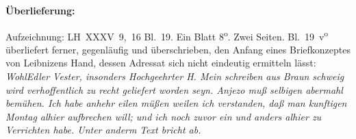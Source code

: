 %
%
%
%
\frenchspacing%
%
\begin{ledgroupsized}[r]{120mm}
\footnotesize
\pstart
\noindent\textbf{Überlieferung:}
\pend
\end{ledgroupsized}
\begin{ledgroupsized}[r]{114mm}
\footnotesize
\pstart \parindent -6mm
%
Aufzeichnung:
LH~XXXV~9,~16 Bl.~19.
Ein Blatt 8\textsuperscript{o}.
Zwei Seiten.
Bl.~19~v\textsuperscript{o} überliefert ferner, gegenläufig und überschrieben, den Anfang eines Briefkonzeptes von Leibnizens Hand,
dessen Adressat sich nicht eindeutig ermitteln lässt: %
\textit{WohlEdler Vester,\protect{} %
insonders Hochgeehrter H. %
Mein schreiben aus Braun%
schweig\protect{} wird verhoffentlich %
zu recht geliefert worden %
seyn. Anjezo muß %
selbigen abermahl bemühen. %
Ich habe anhehr eilen müßen %
weilen ich verstanden, daß %
man kunftigen Montag %
alhier aufbrechen will; und %
ich noch zuvor ein und anders %
alhier zu Verrichten habe. %
Unter anderm} \lbrack\textit{Text bricht ab.}\rbrack\
\pend
\end{ledgroupsized}
%
\vspace{5mm}
